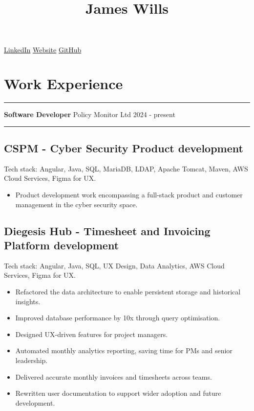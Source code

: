 \documentclass[
  11pt,
  a4paper,
]{article}
\title{James Wills}
\author{}
\date{}
\providecommand{\tightlist}{%
  \setlength{\itemsep}{0pt}\setlength{\parskip}{0pt}}
\begin{document}
\maketitle

\href{http://linkedin.com/in/jamesjwills}{LinkedIn} \textbar{}
\href{http://jameswills.org}{Website} \textbar{}
\href{http://github.com/jamesjwills}{GitHub}

\section{Work Experience}\label{work-experience}

\noindent\rule{\textwidth}{0.4pt}

\textbf{Software Developer} \textbar{} Policy Monitor Ltd \textbar{}
2024 - present

\noindent\rule{\textwidth}{0.4pt}

\subsection{CSPM - Cyber Security Product
development}\label{cspm---cyber-security-product-development}

Tech stack: Angular, Java, SQL, MariaDB, LDAP, Apache Tomcat, Maven, AWS
Cloud Services, Figma for UX.

\begin{itemize}
\tightlist
\item
  Product development work encompassing a full-stack product and
  customer management in the cyber security space.
\end{itemize}

\subsection{Diegesis Hub - Timesheet and Invoicing Platform
development}\label{diegesis-hub---timesheet-and-invoicing-platform-development}

Tech stack: Angular, Java, SQL, UX Design, Data Analytics, AWS Cloud
Services, Figma for UX.

\begin{itemize}
\tightlist
\item
  Refactored the data architecture to enable persistent storage and
  historical insights.
\item
  Improved database performance by 10x through query optimisation.
\item
  Designed UX-driven features for project managers.
\item
  Automated monthly analytics reporting, saving time for PMs and senior
  leadership.
\item
  Delivered accurate monthly invoices and timesheets across teams.
\item
  Rewritten user documentation to support wider adoption and future
  development.
\end{itemize}
\end{document}
